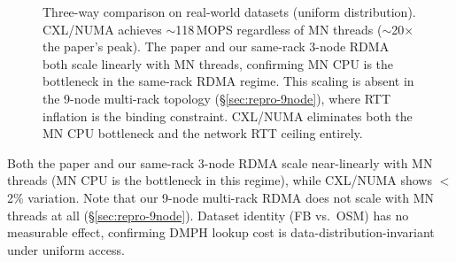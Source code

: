 \documentclass[conference]{IEEEtran}
\begin{document}
\begin{figure}[H]
\centering
{}
\caption{Three-way comparison on real-world datasets (uniform distribution). CXL/NUMA achieves $\sim$118\,MOPS regardless of MN threads ($\sim$20$\times$ the paper's peak). The paper and our same-rack 3-node RDMA both scale linearly with MN threads, confirming MN CPU is the bottleneck in the same-rack RDMA regime. This scaling is absent in the 9-node multi-rack topology (\S\ref{sec:repro-9node}), where RTT inflation is the binding constraint. CXL/NUMA eliminates both the MN CPU bottleneck and the network RTT ceiling entirely.}
\label{fig:dataset-3way-cmp}
\end{figure}

Both the paper and our same-rack 3-node RDMA scale near-linearly with MN threads (MN CPU is the bottleneck in this regime), while CXL/NUMA shows $<$2\% variation. Note that our 9-node multi-rack RDMA does not scale with MN threads at all (\S\ref{sec:repro-9node}). Dataset identity (FB vs.\ OSM) has no measurable effect, confirming DMPH lookup cost is data-distribution-invariant under uniform access.

\end{document}
